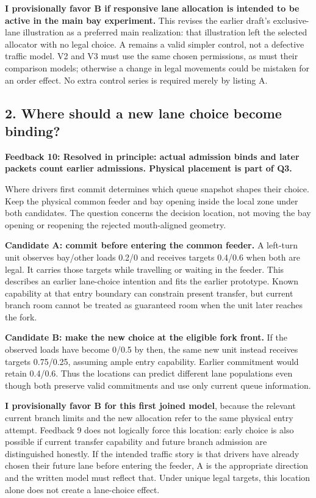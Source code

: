 \documentclass[11pt,a4paper]{article}
\begin{document}
\textbf{I provisionally favor B if responsive lane allocation is intended to be active in the main bay experiment.} This revises the earlier draft's exclusive-lane illustration as a preferred main realization: that illustration left the selected allocator with no legal choice. A remains a valid simpler control, not a defective traffic model. V2 and V3 must use the same chosen permissions, as must their comparison models; otherwise a change in legal movements could be mistaken for an order effect. No extra control series is required merely by listing A.

\subsection*{2. Where should a new lane choice become binding?}

\textbf{Feedback 10: Resolved in principle: actual admission binds and later packets count earlier admissions. Physical placement is part of Q3.}

Where drivers first commit determines which queue snapshot shapes their choice. Keep the physical common feeder and bay opening inside the local zone under both candidates. The question concerns the decision location, not moving the bay opening or reopening the rejected mouth-aligned geometry.

\textbf{Candidate A: commit before entering the common feeder.} A left-turn unit observes bay/other loads 0.2/0 and receives targets 0.4/0.6 when both are legal. It carries those targets while travelling or waiting in the feeder. This describes an earlier lane-choice intention and fits the earlier prototype. Known capability at that entry boundary can constrain present transfer, but current branch room cannot be treated as guaranteed room when the unit later reaches the fork.

\textbf{Candidate B: make the new choice at the eligible fork front.} If the observed loads have become 0/0.5 by then, the same new unit instead receives targets 0.75/0.25, assuming ample entry capability. Earlier commitment would retain 0.4/0.6. Thus the locations can predict different lane populations even though both preserve valid commitments and use only current queue information.

\textbf{I provisionally favor B for this first joined model}, because the relevant current branch limits and the new allocation refer to the same physical entry attempt. Feedback 9 does not logically force this location: early choice is also possible if current transfer capability and future branch admission are distinguished honestly. If the intended traffic story is that drivers have already chosen their future lane before entering the feeder, A is the appropriate direction and the written model must reflect that. Under unique legal targets, this location alone does not create a lane-choice effect.
\end{document}

